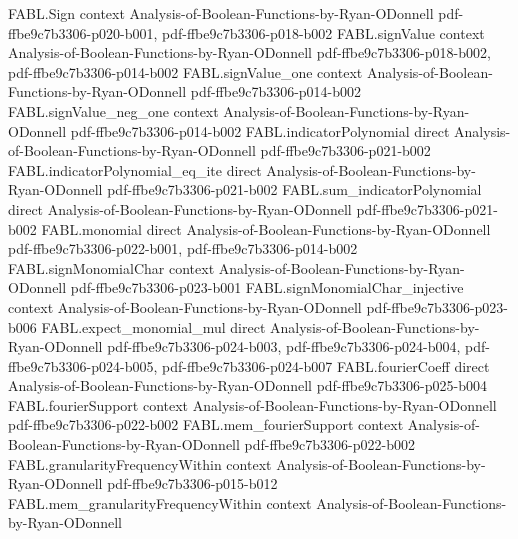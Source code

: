 \begin{theorem}
\label{FABL.noiseSensitivity_dictator}
\leanok
{}
\proofstep
  {FABL.Sign}
  {context}
  {Analysis-of-Boolean-Functions-by-Ryan-ODonnell}
  {pdf-ffbe9c7b3306-p020-b001,
    pdf-ffbe9c7b3306-p018-b002}
\proofstep
  {FABL.signValue}
  {context}
  {Analysis-of-Boolean-Functions-by-Ryan-ODonnell}
  {pdf-ffbe9c7b3306-p018-b002,
    pdf-ffbe9c7b3306-p014-b002}
\proofstep
  {FABL.signValue_one}
  {context}
  {Analysis-of-Boolean-Functions-by-Ryan-ODonnell}
  {pdf-ffbe9c7b3306-p014-b002}
\proofstep
  {FABL.signValue_neg_one}
  {context}
  {Analysis-of-Boolean-Functions-by-Ryan-ODonnell}
  {pdf-ffbe9c7b3306-p014-b002}
\proofstep
  {FABL.indicatorPolynomial}
  {direct}
  {Analysis-of-Boolean-Functions-by-Ryan-ODonnell}
  {pdf-ffbe9c7b3306-p021-b002}
\proofstep
  {FABL.indicatorPolynomial_eq_ite}
  {direct}
  {Analysis-of-Boolean-Functions-by-Ryan-ODonnell}
  {pdf-ffbe9c7b3306-p021-b002}
\proofstep
  {FABL.sum_indicatorPolynomial}
  {direct}
  {Analysis-of-Boolean-Functions-by-Ryan-ODonnell}
  {pdf-ffbe9c7b3306-p021-b002}
\proofstep
  {FABL.monomial}
  {direct}
  {Analysis-of-Boolean-Functions-by-Ryan-ODonnell}
  {pdf-ffbe9c7b3306-p022-b001,
    pdf-ffbe9c7b3306-p014-b002}
\proofstep
  {FABL.signMonomialChar}
  {context}
  {Analysis-of-Boolean-Functions-by-Ryan-ODonnell}
  {pdf-ffbe9c7b3306-p023-b001}
\proofstep
  {FABL.signMonomialChar_injective}
  {context}
  {Analysis-of-Boolean-Functions-by-Ryan-ODonnell}
  {pdf-ffbe9c7b3306-p023-b006}
\proofstep
  {FABL.expect_monomial_mul}
  {direct}
  {Analysis-of-Boolean-Functions-by-Ryan-ODonnell}
  {pdf-ffbe9c7b3306-p024-b003,
    pdf-ffbe9c7b3306-p024-b004,
    pdf-ffbe9c7b3306-p024-b005,
    pdf-ffbe9c7b3306-p024-b007}
\proofstep
  {FABL.fourierCoeff}
  {direct}
  {Analysis-of-Boolean-Functions-by-Ryan-ODonnell}
  {pdf-ffbe9c7b3306-p025-b004}
\proofstep
  {FABL.fourierSupport}
  {context}
  {Analysis-of-Boolean-Functions-by-Ryan-ODonnell}
  {pdf-ffbe9c7b3306-p022-b002}
\proofstep
  {FABL.mem_fourierSupport}
  {context}
  {Analysis-of-Boolean-Functions-by-Ryan-ODonnell}
  {pdf-ffbe9c7b3306-p022-b002}
\proofstep
  {FABL.granularityFrequencyWithin}
  {context}
  {Analysis-of-Boolean-Functions-by-Ryan-ODonnell}
  {pdf-ffbe9c7b3306-p015-b012}
\proofstep
  {FABL.mem_granularityFrequencyWithin}
  {context}
  {Analysis-of-Boolean-Functions-by-Ryan-ODonnell}

\end{theorem}

